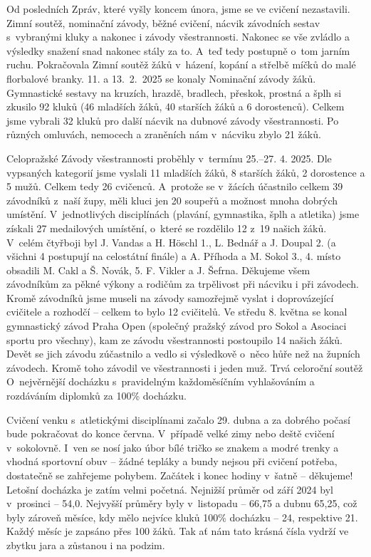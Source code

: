 \documentclass[11pt]{article}
\begin{document}
\clearpage
\nopagecolor
\normalcolor

\restoregeometry
\pagestyle{standard}


Od posledních Zpráv, které vyšly koncem února, jsme se ve cvičení
nezastavili.
Zimní soutěž, nominační závody, běžné cvičení, nácvik závodních sestav
s~vybranými kluky a nakonec i závody všestrannosti. Nakonec se vše
zvládlo
a výsledky snažení snad nakonec stály za to. A~teď tedy postupně o~tom
jarním ruchu.
Pokračovala Zimní soutěž žáků v~házení, kopání a střelbě míčků
do malé
florbalové branky.
11. a 13.~2.~2025 se konaly Nominační závody žáků. Gymnastické
sestavy
na kruzích, hrazdě, bradlech, přeskok, prostná a šplh si zkusilo 92
kluků (46
mladších žáků, 40 starších žáků a 6 dorostenců). Celkem jsme vybrali 32
kluků pro další nácvik na dubnové závody všestrannosti. Po různých
omluvách, nemocech a zraněních nám v~nácviku zbylo 21 žáků.

Celopražské Závody všestrannosti proběhly v~termínu 25.--27. 4.
2025.
Dle vypsaných kategorií jsme vyslali 11 mladších žáků, 8 starších žáků,
2
dorostence a 5 mužů. Celkem tedy 26 cvičenců. A~protože se v~žácích
účastnilo celkem 39 závodníků z~naší župy, měli kluci jen 20 soupeřů a
možnost mnoha dobrých umístění. V~jednotlivých disciplínách (plavání,
gymnastika, šplh a atletika) jsme získali 27 medailových umístění,
o~které se
rozdělilo 12 z~19 našich žáků. V~celém čtyřboji byl J. Vandas a H.
Höschl 1., L. Bednář a J. Doupal 2. (a všichni 4 postupují na celostátní
finále) a A. Příhoda a M. Sokol 3., 4. místo obsadili M. Cakl a Š.
Novák, 5. F. Vikler a J. Šefrna.
Děkujeme všem závodníkům za pěkné výkony a rodičům za trpělivost při
nácviku i při závodech.
Kromě závodníků jsme museli na závody samozřejmě vyslat i doprovázející
cvičitele a rozhodčí -- celkem to bylo 12 cvičitelů.
Ve středu 8. května se konal gymnastický závod Praha Open
(společný
pražský závod pro Sokol a Asociaci sportu pro všechny), kam ze závodu
všestrannosti postoupilo 14 našich žáků. Devět se jich závodu zúčastnilo
a
vedlo si výsledkově o~něco hůře než na župních závodech. Kromě toho
závodil ve všestrannosti i jeden muž.
Trvá celoroční soutěž O~nejvěrnější docházku s~pravidelným
každoměsíčním vyhlašováním a rozdáváním diplomků za 100\% docházku.

Cvičení venku s~atletickými disciplínami začalo 29. dubna a za dobrého
počasí bude pokračovat do konce června. V~případě velké zimy nebo deště
cvičení v~sokolovně. I~ven se nosí jako úbor bílé tričko se znakem a
modré
trenky a vhodná sportovní obuv -- žádné tepláky a bundy nejsou při
cvičení
potřeba, dostatečně se zahřejeme pohybem. Začátek i konec hodiny v~šatně
-- děkujeme!
Letošní docházka je zatím velmi početná. Nejnižší průměr od
září 2024
byl v~prosinci -- 54,0. Nejvyšší průměry byly v~listopadu -- 66,75 a
dubnu
65,25, což byly zároveň měsíce, kdy mělo nejvíce kluků 100\% docházku --
24, respektive 21. Každý měsíc je zapsáno přes 100 žáků. Tak ať nám tato
krásná čísla vydrží ve zbytku jara a zůstanou i na podzim.
\end{document}
